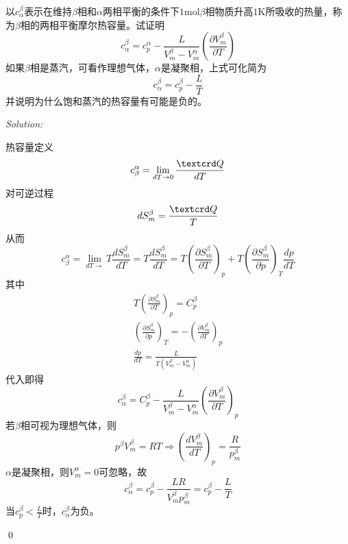 \documentclass[12pt,a4paper]{article}
\newenvironment{problem}[2][Problem]{\begin{trivlist}
\item[\hskip \labelsep {\bfseries #1}\hskip \labelsep {\bfseries #2.}]}{\end{trivlist}}
\newenvironment{sol}
    {\emph{Solution:}
    }
    {
    \qed
    }
\begin{document}
\begin{problem}{3.9}
以$c_{\alpha}^{\beta}$表示在维持$\beta$相和$\alpha$两相平衡的条件下$1$mol$\beta$相物质升高$1$K所吸收的热量，称为$\beta$相的两相平衡摩尔热容量。试证明
\[
c_{\alpha}^{\beta}=c_p^{\alpha}-\frac{L}{V_m^{\beta}-V_m^{\alpha}}\left(\frac{\partial V_m^{\beta}}{\partial T}\right)
\]
如果$\beta$相是蒸汽，可看作理想气体，$\alpha$是凝聚相，上式可化简为
\[
c_{\alpha}^{\beta}=c_p^{\beta}-\frac{L}{T}
\]
并说明为什么饱和蒸汽的热容量有可能是负的。
\end{problem}
\begin{sol}
热容量定义
\begin{equation}
c_{\beta}^{\alpha}=\lim_{dT\rightarrow0}\frac{\text{\textcrd}Q}{dT}
\end{equation}
对可逆过程
\begin{equation}
dS_m^{\beta}=\frac{\text{\textcrd}Q}{T}
\end{equation}
从而
\begin{equation}
c_{\beta}^{\alpha}=\lim_{dT\rightarrow}T\frac{dS_m^{\beta}}{dT}=T\frac{dS_m^{\beta}}{dT}=T\left(\frac{\partial S_m^{\beta}}{\partial T}\right)_p+T\left(\frac{\partial S_m^{\beta}}{\partial p}\right)_T\frac{dp}{dT}
\end{equation}
其中
\begin{gather}
T\left(\frac{\partial S_m^{\beta}}{\partial T}\right)_p=C_p^{\beta}\\
\left(\frac{\partial S_m^{\beta}}{\partial p}\right)_T=-\left(\frac{\partial V_m^{\beta}}{\partial T}\right)_p\\
\frac{dp}{dT}=\frac{L}{T(V_m^{\beta}-V_m^{\alpha})}
\end{gather}
代入即得
\begin{equation}
c_{\alpha}^{\beta}=C_p^{\beta}-\frac{L}{V_m^{\beta}-V_m^{\alpha}}\left(\frac{\partial V_m^{\beta}}{\partial T}\right)_p
\end{equation}
若$\beta$相可视为理想气体，则
\begin{equation}
p^{\beta}V_m^{\beta}=RT\Longrightarrow\left(\frac{dV_m^{\beta}}{dT}\right)_p=\frac{R}{p_m^{\beta}}
\end{equation}
$\alpha$是凝聚相，则$V_m^{\alpha}=0$可忽略，故
\begin{equation}
c_{\alpha}^{\beta}=c_p^{\beta}-\frac{LR}{V_m^{\beta}p_m^{\beta}}=c_p^{\beta}-\frac{L}{T}
\end{equation}
当$c_p^{\beta}<\frac{L}{T}$时，$c_{\alpha}^{\beta}$为负。
\end{sol}
\end{document}
